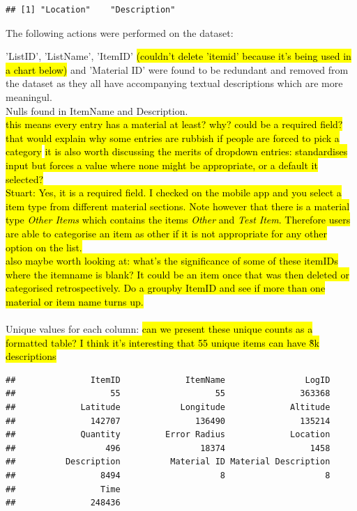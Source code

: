 \documentclass[10pt]{article}\usepackage[]{graphicx}\usepackage[]{color}
\makeatletter
\newenvironment{kframe}{%
 \def\at@end@of@kframe{}%
 \ifinner\ifhmode%
  \def\at@end@of@kframe{\end{minipage}}%
  \begin{minipage}{\columnwidth}%
 \fi\fi%
 \def\FrameCommand##1{\hskip\@totalleftmargin \hskip-\fboxsep
 \colorbox{shadecolor}{##1}\hskip-\fboxsep
     \hskip-\linewidth \hskip-\@totalleftmargin \hskip\columnwidth}%
 \MakeFramed {\advance\hsize-\width
   \@totalleftmargin\z@ \linewidth\hsize
   \@setminipage}}%
 {\par\unskip\endMakeFramed%
 \at@end@of@kframe}
\newenvironment{knitrout}{}{} %
\makeatother
\begin{document}
\begin{knitrout}\small
{}\color{fgcolor}\begin{kframe}
\begin{verbatim}
## [1] "Location"    "Description"
\end{verbatim}
\end{kframe}
\end{knitrout}
The following actions were performed on the dataset:

'ListID', 'ListName', 'ItemID' \hl {(couldn't delete 'itemid' because it's being used in a chart below)} and 'Material ID' were found to be redundant and removed from the dataset as they all have accompanying textual descriptions which are more meaningul.
\\
Nulls found in ItemName and Description.\\ 
\hl{this means every entry has a material at least? why? could be a required field? that would explain why some entries are rubbish if people are forced to pick a category}
\hl{it is also worth discussing the merits of dropdown entries: standardises input but forces a value where none might be appropriate, or a default it selected?}
\\
\hl{Stuart: Yes, it is a required field. I checked on the mobile app and you select a item type from different material sections. Note however that there is a material type \emph{Other Items} which contains the items \emph{Other} and \emph{Test Item}. Therefore users are able to categorise an item as other if it is not appropriate for any other option on the list.}
\\
\hl{also maybe worth looking at: what's the significance of some of these itemIDs where the itemname is blank? It could be an item once that was then deleted or categorised retrospectively. Do a groupby ItemID and see if more than one material or item name turns up.}\\
\\
Unique values for each column: \hl{can we present these unique counts as a formatted table? I think it's interesting that 55 unique items can have \~8k descriptions}
\begin{knitrout}\small
{}\color{fgcolor}\begin{kframe}
\begin{verbatim}
##               ItemID             ItemName                LogID 
##                   55                   55               363368 
##             Latitude            Longitude             Altitude 
##               142707               136490               135214 
##             Quantity         Error Radius             Location 
##                  496                18374                 1458 
##          Description          Material ID Material Description 
##                 8494                    8                    8 
##                 Time 
##               248436
\end{verbatim}
\end{kframe}
\end{knitrout}
\end{document}
